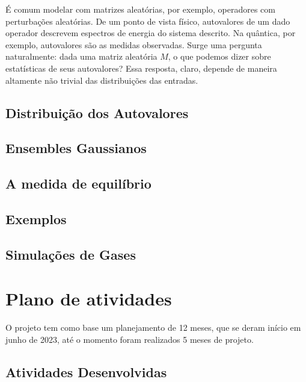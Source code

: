 \documentclass[12pt]{report}
\begin{document}
	É comum modelar com matrizes aleatórias, por exemplo, operadores com perturbações aleatórias. De um ponto de vista físico, autovalores de um dado operador descrevem espectros de energia do sistema descrito. Na quântica, por exemplo, autovalores são as medidas observadas. Surge uma pergunta naturalmente: dada uma matriz aleatória $M$, o que podemos dizer sobre estatísticas de seus autovalores? Essa resposta, claro, depende de maneira altamente não trivial das distribuições das entradas.  
	
	\section{Distribuição dos Autovalores}
	
	
	
	\section{Ensembles Gaussianos}
	
	
	
	\section{A medida de equilíbrio}
	
	
	
	\section{Exemplos}
	
	
	
	\section{Simulações de Gases}
	\label{sec: simul}
	
	

	{\let\clearpage\relax \chapter{Plano de atividades}}\label{chp:plano}
	
	O projeto tem como base um planejamento de 12 meses, que se deram início em junho de 2023, até o momento foram realizados 5 meses de projeto.
	
	\section{Atividades Desenvolvidas}
	\label{section:atividadesdesenvolvidas}
	
\end{document}
